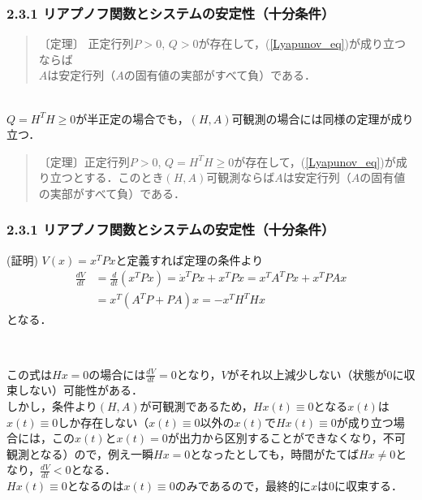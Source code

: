 \begin{frame}[t]
\frametitle{2.3.1 リアプノフ関数とシステムの安定性（十分条件）}
\begin{quote}
〔定理〕 正定行列$P>0$, $Q>0$が存在して，(\ref{Lyapunov_eq})が成り立つならば\\
$A$は安定行列（$A$の固有値の実部がすべて負）である．
\end{quote}
\ \\

$Q=H^T H \geq 0$が半正定の場合でも，$(H,A)$可観測の場合には同様の定理が成り立つ．
\\[3mm]

\begin{quote}
〔定理〕正定行列$P>0$, $Q=H^T H \geq 0$が存在して，(\ref{Lyapunov_eq})が成り立つとする．このとき$(H,A)$可観測ならば$A$は安定行列（$A$の固有値の実部がすべて負）である．
\end{quote}

\end{frame}

\begin{frame}[t]
\frametitle{2.3.1 リアプノフ関数とシステムの安定性（十分条件）}
\noindent
(証明) 
$V(x)= x^T P x$と定義すれば定理の条件より
\begin{align}
 \frac{d V}{d t} &= \frac{d}{dt} (x^T P x) = \dot{x}^T P x + x^T P \dot{x} = x^T A^T P x + x^T P A x 
\nonumber \\
	&= x^T (A^T P + P A) x = - x^T H^T H x
\end{align}
となる．

\ 

この式は$Hx=0$の場合には$\frac{d V}{d t}=0$となり，$V$がそれ以上減少しない（状態が$0$に収束しない）可能性がある．\\[3mm]

しかし，条件より$(H,A)$が可観測であるため，$Hx(t) \equiv 0$となる$x(t)$は$x(t) \equiv 0$しか存在しない（$x(t) \equiv 0$以外の$x(t)$で$H x(t) \equiv 0$が成り立つ場合には，この$x(t)$と$x(t)=0$が出力から区別することができなくなり，不可観測となる）ので，例え一瞬$Hx=0$となったとしても，時間がたてば$Hx \neq 0$となり，$\frac{d V}{dt}<0$となる．\\[3mm]

$Hx(t) \equiv 0$となるのは$x(t) \equiv 0$のみであるので，最終的に$x$は$0$に収束する．


\end{frame}

